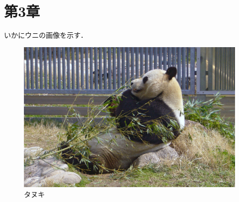 \section{第3章}
\label{sec:3}
いかにウニの画像を示す．

\begin{figure}[]
    \centering
    \includegraphics[width=0.8\linewidth]{figs/crab.jpg}
    \caption{タヌキ}
    \label{fig:dog}
\end{figure}

